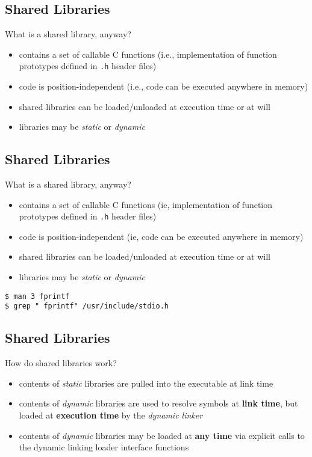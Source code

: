 \documentclass[xga]{xdvislides}
\begin{document}
\subsection{Shared Libraries}
What is a shared library, anyway?
\begin{itemize}
	\item contains a set of callable C functions (i.e., implementation
		of function prototypes defined in {\tt .h} header files)
	\item code is position-independent (i.e., code can be executed anywhere
		in memory)
	\item shared libraries can be loaded/unloaded at execution time or at will
	\item libraries may be {\em static} or {\em dynamic}
\end{itemize}

\subsection{Shared Libraries}
What is a shared library, anyway?
\begin{itemize}
	\item contains a set of callable C functions (ie, implementation
		of function prototypes defined in {\tt .h} header files)
	\item code is position-independent (ie, code can be executed anywhere
		in memory)
	\item shared libraries can be loaded/unloaded at execution time or at will
	\item libraries may be {\em static} or {\em dynamic}
\end{itemize}
\begin{verbatim}
$ man 3 fprintf
$ grep " fprintf" /usr/include/stdio.h
\end{verbatim}


\subsection{Shared Libraries}
How do shared libraries work?
\begin{itemize}
	\item contents of {\em static} libraries are pulled into the
		executable at link time
	\item contents of {\em dynamic} libraries are used to resolve
		symbols at {\bf link time}, but loaded at {\bf execution time} by the
		{\em dynamic linker}
	\item contents of {\em dynamic} libraries may be loaded at {\bf any
		time} via explicit calls to the dynamic linking loader interface
		functions
\end{itemize}
\end{document}
